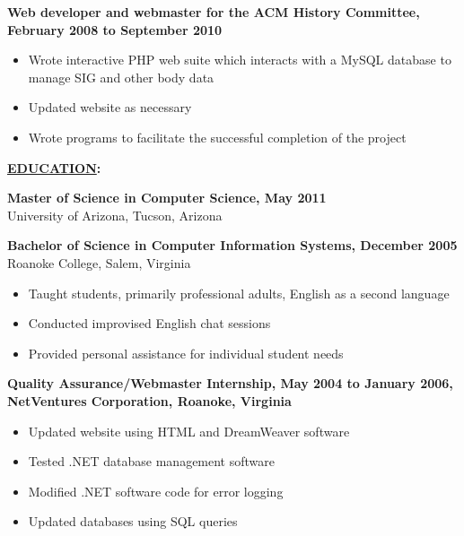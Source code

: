 \documentclass[10pt]{res}
\begin{document}
\begin{resume}
\begin{flushleft}
{\bf Web developer and webmaster for the ACM History Committee, February 2008 to September 2010}
\end{flushleft}

\begin{itemize}
\setlength{\itemsep}{1pt}
\setlength{\parskip}{0pt}
\setlength{\parsep}{0pt}
\item Wrote interactive PHP web suite which interacts with a MySQL database to manage SIG and other body data
\item Updated website as necessary
\item Wrote programs to facilitate the successful completion of the project
\end{itemize}

\begin{flushleft}
{\bf \underline{EDUCATION}:}
\end{flushleft}
{\bf Master of Science in Computer Science, May 2011}\\
University of Arizona, Tucson, Arizona

\begin{flushleft}
{\bf Bachelor of Science in Computer Information Systems, December 2005}\\
Roanoke College, Salem, Virginia
\end{flushleft}


\begin{itemize}
\setlength{\itemsep}{1pt}
\setlength{\parskip}{0pt}
\setlength{\parsep}{0pt}
\item Taught students, primarily professional adults, English as a second language
\item Conducted improvised English chat sessions
\item Provided personal assistance for individual student needs
\end{itemize}

\begin{flushleft}
{\bf Quality Assurance/Webmaster Internship, May 2004 to January 2006, NetVentures Corporation, Roanoke, Virginia}
\end{flushleft}

\begin{itemize}
\setlength{\itemsep}{1pt}
\setlength{\parskip}{0pt}
\setlength{\parsep}{0pt}
\item Updated website using HTML and DreamWeaver software
\item Tested .NET database management software
\item Modified .NET software code for error logging
\item Updated databases using SQL queries
\end{itemize}


\end{resume}
\end{document}
